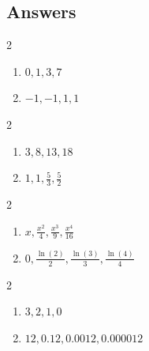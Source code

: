 \documentclass{ximera}
\begin{document}
	\author{Stitz-Zeager}



\subsection{Answers}

\begin{multicols}{2}
\begin{enumerate}

\item $0, 1, 3, 7$
\item $-1, -1, 1, 1$

\setcounter{HW}{\value{enumi}}
\end{enumerate}
\end{multicols}

\begin{multicols}{2}
\begin{enumerate}
\setcounter{enumi}{\value{HW}}

\item $3, 8, 13, 18$
\item $1, 1, \frac{5}{3}, \frac{5}{2}$

\setcounter{HW}{\value{enumi}}
\end{enumerate}
\end{multicols}

\begin{multicols}{2}
\begin{enumerate}
\setcounter{enumi}{\value{HW}}

\item $x, \frac{x^{2}}{4}, \frac{x^{3}}{9}, \frac{x^{4}}{16}$
\item $0, \frac{\ln(2)}{2}, \frac{\ln(3)}{3}, \frac{\ln(4)}{4}$

\setcounter{HW}{\value{enumi}}
\end{enumerate}
\end{multicols}

\begin{multicols}{2}
\begin{enumerate}
\setcounter{enumi}{\value{HW}}

\item $3, 2, 1, 0$
\item $12, 0.12, 0.0012, 0.000012$

\setcounter{HW}{\value{enumi}}
\end{enumerate}
\end{multicols}
\end{document}
